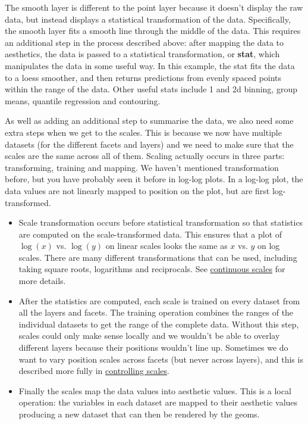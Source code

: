 The smooth layer is different to the point layer because it doesn't
display the raw data, but instead displays a statistical transformation
of the data. Specifically, the smooth layer fits a smooth line through
the middle of the data. This requires an additional step in the process
described above: after mapping the data to aesthetics, the data is
passed to a statistical transformation, or \textbf{stat}, which
manipulates the data in some useful way. In this example, the stat fits
the data to a loess smoother, and then returns predictions from evenly
spaced points within the range of the data. Other useful stats include 1
and 2d binning, group means, quantile regression and contouring.

As well as adding an additional step to summarise the data, we also need
some extra steps when we get to the scales. This is because we now have
multiple datasets (for the different facets and layers) and we need to
make sure that the scales are the same across all of them. Scaling
actually occurs in three parts: transforming, training and mapping. We
haven't mentioned transformation before, but you have probably seen it
before in log-log plots. In a log-log plot, the data values are not
linearly mapped to position on the plot, but are first log-transformed.

\begin{itemize}
\item
  Scale transformation occurs before statistical transformation so that
  statistics are computed on the scale-transformed data. This ensures
  that a plot of \(\log(x)\) vs. \(\log(y)\) on linear scales looks the
  same as \(x\) vs. \(y\) on log scales. There are many different
  transformations that can be used, including taking square roots,
  logarithms and reciprocals. See
  \hyperref[ssub:scale-continuous]{continuous scales} for more details.
\item
  After the statistics are computed, each scale is trained on every
  dataset from all the layers and facets. The training operation
  combines the ranges of the individual datasets to get the range of the
  complete data. Without this step, scales could only make sense locally
  and we wouldn't be able to overlay different layers because their
  positions wouldn't line up. Sometimes we do want to vary position
  scales across facets (but never across layers), and this is described
  more fully in \hyperref[sub:controlling-scales]{controlling scales}.
\item
  Finally the scales map the data values into aesthetic values. This is
  a local operation: the variables in each dataset are mapped to their
  aesthetic values producing a new dataset that can then be rendered by
  the geoms.
\end{itemize}

